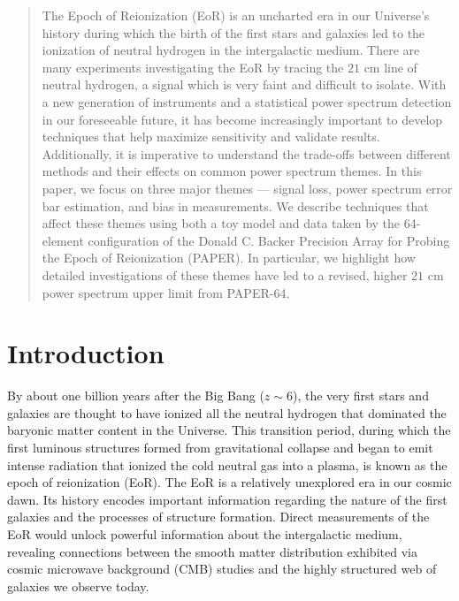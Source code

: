 \documentclass[preprint2,numberedappendix,tighten]{aastex6}  %
\begin{document}

\begin{abstract}
The Epoch of Reionization (EoR) is an uncharted era in our Universe's history during which the birth of the first stars and galaxies led to the ionization of neutral hydrogen in the intergalactic medium. There are many experiments investigating the EoR by tracing the $21$ cm line of neutral hydrogen, a signal which is very faint and difficult to isolate. With a new generation of instruments and a statistical power spectrum detection in our foreseeable future, it has become increasingly important to develop techniques that help maximize sensitivity and validate results. Additionally, it is imperative to understand the trade-offs between different methods and their effects on common power spectrum themes. In this paper, we focus on three major themes --- signal loss, power spectrum error bar estimation, and bias in measurements. We describe techniques that affect these themes using both a toy model and data taken by the 64-element configuration of the Donald C. Backer Precision Array for Probing the Epoch of Reionization (PAPER). In particular, we highlight how detailed investigations of these themes have led to a revised, higher $21$ cm power spectrum upper limit from PAPER-64. 
\end{abstract}


\section{Introduction}
\label{sec:Intro}

By about one billion years after the Big Bang ($z \sim 6$), the very first stars and galaxies are thought to have ionized all the neutral hydrogen that dominated the baryonic matter content in the Universe. This transition period, during which the first luminous structures formed from gravitational collapse and began to emit intense radiation that ionized the cold neutral gas into a plasma, is known as the epoch of reionization (EoR). The EoR is a relatively unexplored era in our cosmic dawn. Its history encodes important information regarding the nature of the first galaxies and the processes of structure formation. Direct measurements of the EoR would unlock powerful information about the intergalactic medium, revealing connections between the smooth matter distribution exhibited via cosmic microwave background (CMB) studies and the highly structured web of galaxies we observe today.
\end{document}
